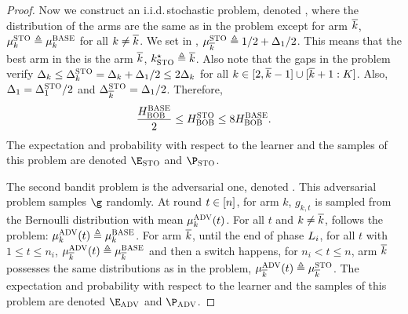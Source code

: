 \begin{proof}
	
	Now we construct an i.i.d.\,stochastic problem, denoted \stoPro{}, where
	the distribution of the arms are the same as in the \basePro{} 
	problem  except for arm $\overline k$, $\mu^{\textsc{STO}}_{k}\triangleq \mu^{\textsc{BASE}}_{k} $ 
	for all $k\neq \overline k$.
	We set in  \stoPro{},         
	$\mu^{\textsc{STO}}_{\overline k} \triangleq 1/2 + \Delta_1/2$.
	This means that 
	the best arm in the \stoPro{} is the arm $\overline k$, $k^\star_{\textsc{STO}}\triangleq\overline k$.
	Also note that the gaps in the \stoPro{} problem verify
	$\Delta_k\leq \Delta^{\textsc{STO}}_k=\Delta_k+\Delta_1/2\leq 2\Delta_k$ for 
	all $k\in[2,\overline k-1]\cup[\overline k+1:K]$. Also, $\Delta_1= 
	\Delta^{\textsc{STO}}_1/2$ and $ \Delta^{\textsc{STO}}_{\overline k}=\Delta_{1}/2$.
	Therefore,  \[\frac{H_{{\normalfont \textsc{{BOB}}}}^{\textsc{BASE}}}{2}
	\leq H_{{\normalfont \textsc{{BOB}}}}^{\textsc{STO}}\leq 8H_{{\normalfont \textsc{{BOB}}}}^{\textsc{BASE}}.\]
	The expectation and probability with respect to the
	learner and the samples of this problem are denoted
	$\Exp_{\stoPro}$ and $\Pro_{\stoPro}$.
	
	
	
	The second bandit problem is the adversarial one, denoted \advPro{}.
	This adversarial problem samples  $\gainVector$ randomly.
	At round $t\in[n]$, for arm $k$, $g_{k,t}$ is sampled 
	from the Bernoulli distribution with mean $\mu_{k}^{\textsc{ADV}}(t)$.
	For all $t$ and $k\neq\overline k$, \advPro{} follows the \basePro{} 
	problem:  $\mu_{k}^{\textsc{ADV}}(t)\triangleq\mu_{k}^{\textsc{BASE}}$.
	For arm $\overline k$,
	until the end of phase $L_i$, for all $t$ with $1\leq 
	t\leq n_i$, $\mu^{\textsc{ADV}}_{\overline k}(t)\triangleq\mu_{\overline k}^{\textsc{BASE}}$ 
	and then a switch happens, for $n_i< t\leq n$, arm $\overline k$ 
	possesses  the same distributions as in the \stoPro{} problem,  
	$\mu^{\textsc{ADV}}_{\overline k}(t)\triangleq \mu_{\overline k}^{\textsc{STO}}$.
	The expectation and probability with respect to the
	learner and the samples of this problem are denoted
	$\Exp_{\advPro}$ and $\Pro_{\advPro}$.
	

\end{proof}
